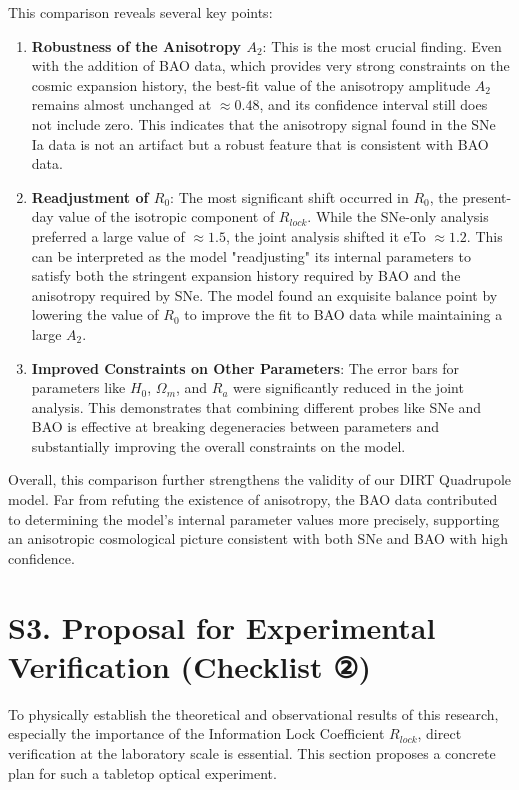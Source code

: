 \documentclass[a4paper,12pt]{article}
\begin{document}
This comparison reveals several key points:
\begin{enumerate}
    \item \textbf{Robustness of the Anisotropy $A_2$}: This is the most crucial finding. Even with the addition of BAO data, which provides very strong constraints on the cosmic expansion history, the best-fit value of the anisotropy amplitude $A_2$ remains almost unchanged at $\approx 0.48$, and its confidence interval still does not include zero. This indicates that the anisotropy signal found in the SNe Ia data is not an artifact but a robust feature that is consistent with BAO data.
    \item \textbf{Readjustment of $R_0$}: The most significant shift occurred in $R_0$, the present-day value of the isotropic component of $R_{lock}$. While the SNe-only analysis preferred a large value of $\approx 1.5$, the joint analysis shifted it eTo $\approx 1.2$. This can be interpreted as the model "readjusting" its internal parameters to satisfy both the stringent expansion history required by BAO and the anisotropy required by SNe. The model found an exquisite balance point by lowering the value of $R_0$ to improve the fit to BAO data while maintaining a large $A_2$.
    \item \textbf{Improved Constraints on Other Parameters}: The error bars for parameters like $H_0$, $\Omega_m$, and $R_a$ were significantly reduced in the joint analysis. This demonstrates that combining different probes like SNe and BAO is effective at breaking degeneracies between parameters and substantially improving the overall constraints on the model.
\end{enumerate}

Overall, this comparison further strengthens the validity of our DIRT Quadrupole model. Far from refuting the existence of anisotropy, the BAO data contributed to determining the model's internal parameter values more precisely, supporting an anisotropic cosmological picture consistent with both SNe and BAO with high confidence.

\section*{S3. Proposal for Experimental Verification (Checklist ②)}
\label{sec:supp_experimental_proposal}

To physically establish the theoretical and observational results of this research, especially the importance of the Information Lock Coefficient $R_{lock}$, direct verification at the laboratory scale is essential. This section proposes a concrete plan for such a tabletop optical experiment.
\end{document}
